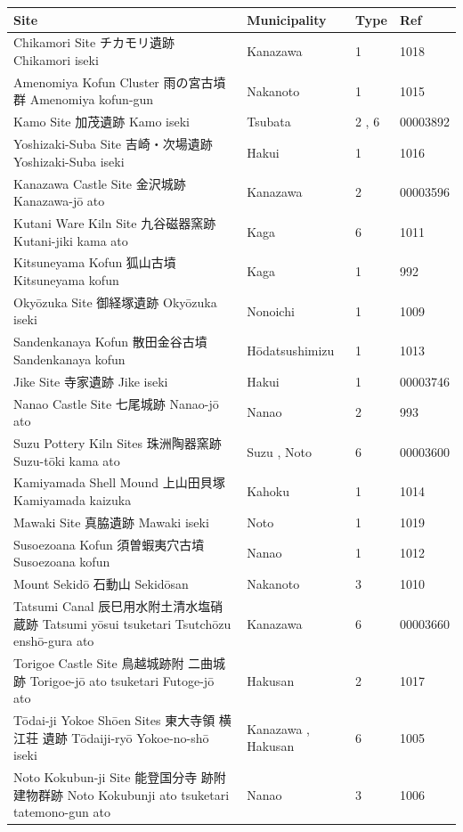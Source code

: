 \documentclass{article}
\begin{document}
\begin{tabular}{llll}
\toprule
Site & Municipality & Type & Ref \\
\midrule
Chikamori Site チカモリ遺跡 Chikamori iseki & Kanazawa & 1 & 1018 \\
Amenomiya Kofun Cluster 雨の宮古墳群 Amenomiya kofun-gun & Nakanoto & 1 & 1015 \\
Kamo Site 加茂遺跡 Kamo iseki & Tsubata & 2 , 6 & 00003892 \\
Yoshizaki-Suba Site 吉崎・次場遺跡 Yoshizaki-Suba iseki & Hakui & 1 & 1016 \\
Kanazawa Castle Site 金沢城跡 Kanazawa-jō ato & Kanazawa & 2 & 00003596 \\
Kutani Ware Kiln Site 九谷磁器窯跡 Kutani-jiki kama ato & Kaga & 6 & 1011 \\
Kitsuneyama Kofun 狐山古墳 Kitsuneyama kofun & Kaga & 1 & 992 \\
Okyōzuka Site 御経塚遺跡 Okyōzuka iseki & Nonoichi & 1 & 1009 \\
Sandenkanaya Kofun 散田金谷古墳 Sandenkanaya kofun & Hōdatsushimizu & 1 & 1013 \\
Jike Site 寺家遺跡 Jike iseki & Hakui & 1 & 00003746 \\
Nanao Castle Site 七尾城跡 Nanao-jō ato & Nanao & 2 & 993 \\
Suzu Pottery Kiln Sites 珠洲陶器窯跡 Suzu-tōki kama ato & Suzu , Noto & 6 & 00003600 \\
Kamiyamada Shell Mound 上山田貝塚 Kamiyamada kaizuka & Kahoku & 1 & 1014 \\
Mawaki Site 真脇遺跡 Mawaki iseki & Noto & 1 & 1019 \\
Susoezoana Kofun 須曽蝦夷穴古墳 Susoezoana kofun & Nanao & 1 & 1012 \\
Mount Sekidō 石動山 Sekidōsan & Nakanoto & 3 & 1010 \\
Tatsumi Canal 辰巳用水附土清水塩硝蔵跡 Tatsumi yōsui tsuketari Tsutchōzu enshō-gura ato & Kanazawa & 6 & 00003660 \\
Torigoe Castle Site 鳥越城跡附 二曲城 跡 Torigoe-jō ato tsuketari Futoge-jō ato & Hakusan & 2 & 1017 \\
Tōdai-ji Yokoe Shōen Sites 東大寺領 横江荘 遺跡 Tōdaiji-ryō Yokoe-no-shō iseki & Kanazawa , Hakusan & 6 & 1005 \\
Noto Kokubun-ji Site 能登国分寺 跡附建物群跡 Noto Kokubunji ato tsuketari tatemono-gun ato & Nanao & 3 & 1006 \\
\bottomrule
\end{tabular}
\end{document}
